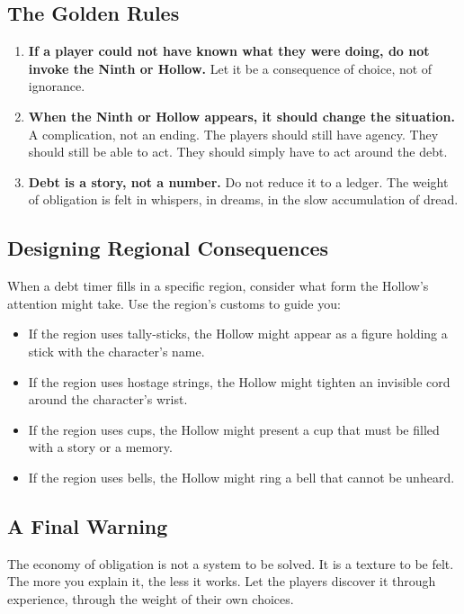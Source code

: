 \documentclass[11pt,letterpaper,twoside]{book}
\begin{document}
\subsection{The Golden Rules}

\begin{enumerate}
\item \textbf{If a player could not have known what they were doing, do not invoke the Ninth or Hollow.} Let it be a consequence of choice, not of ignorance.
\item \textbf{When the Ninth or Hollow appears, it should change the situation.} A complication, not an ending. The players should still have agency. They should still be able to act. They should simply have to act around the debt.
\item \textbf{Debt is a story, not a number.} Do not reduce it to a ledger. The weight of obligation is felt in whispers, in dreams, in the slow accumulation of dread.
\end{enumerate}

\subsection{Designing Regional Consequences}

When a debt timer fills in a specific region, consider what form the Hollow's attention might take. Use the region's customs to guide you:

\begin{itemize}
\item If the region uses tally-sticks, the Hollow might appear as a figure holding a stick with the character's name.
\item If the region uses hostage strings, the Hollow might tighten an invisible cord around the character's wrist.
\item If the region uses cups, the Hollow might present a cup that must be filled with a story or a memory.
\item If the region uses bells, the Hollow might ring a bell that cannot be unheard.
\end{itemize}

\subsection{A Final Warning}

The economy of obligation is not a system to be solved. It is a texture to be felt. The more you explain it, the less it works. Let the players discover it through experience, through the weight of their own choices.
\end{document}
